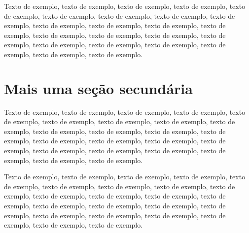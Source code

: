 \documentclass[
	12pt,				%
	oneside,			%
	a4paper,			%
	english,			%
	brazil				%
	]{abntex2ppgsi}
\begin{document}
Texto de exemplo, texto de exemplo, texto de exemplo, texto de exemplo, texto de exemplo, texto de exemplo, texto de exemplo, texto de exemplo, texto de exemplo, texto de exemplo, texto de exemplo, texto de exemplo, texto de exemplo, texto de exemplo, texto de exemplo, texto de exemplo, texto de exemplo, texto de exemplo, texto de exemplo, texto de exemplo, texto de exemplo, texto de exemplo, texto de exemplo.

\section{Mais uma seção secundária}

Texto de exemplo, texto de exemplo, texto de exemplo, texto de exemplo, texto de exemplo, texto de exemplo, texto de exemplo, texto de exemplo, texto de exemplo, texto de exemplo, texto de exemplo, texto de exemplo, texto de exemplo, texto de exemplo, texto de exemplo, texto de exemplo, texto de exemplo, texto de exemplo, texto de exemplo, texto de exemplo, texto de exemplo, texto de exemplo, texto de exemplo.

Texto de exemplo, texto de exemplo, texto de exemplo, texto de exemplo, texto de exemplo, texto de exemplo, texto de exemplo, texto de exemplo, texto de exemplo, texto de exemplo, texto de exemplo, texto de exemplo, texto de exemplo, texto de exemplo, texto de exemplo, texto de exemplo, texto de exemplo, texto de exemplo, texto de exemplo, texto de exemplo, texto de exemplo, texto de exemplo, texto de exemplo.

\postextual



%
%

\end{document}
